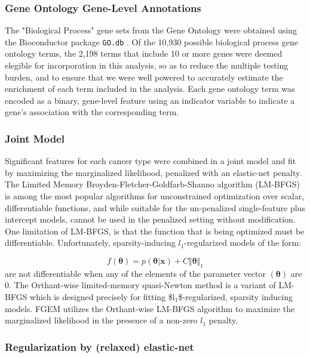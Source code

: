 \subsubsection{Gene Ontology Gene-Level Annotations}\label{sec:orgd117550}

The "Biological Process" gene sets from the Gene Ontology were obtained using the Bioconductor package \texttt{GO.db} \cite{godb}. Of the 10,930 possible biological process gene ontology terms, the 2,198 terms that 
include 10 or more genes were deemed elegible for incorporation in this analysis, so as to reduce the multiple testing burden, and to ensure that we were well powered to accurately estimate the enrichment of each term included in the analysis.  Each gene ontology term was encoded as a binary, gene-level feature using an indicator variable to indicate a gene's association with the corresponding term. 

\subsubsection{Joint Model}\label{sec:orga62a234}

Significant features for each cancer type were combined in a joint model and fit by maximizing the marginalized likelihood, penalized with an elastic-net penalty.  The Limited Memory Broyden-Fletcher-Goldfarb-Shanno algorithm (LM-BFGS) \cite{LMBFGS} is among the most popular algorithms
for unconstrained optimization over scalar, differentiable functions, and while suitable for the un-penalized single-feature plus intercept models, cannot be used in the penalized setting without modification.  One limitation of LM-BFGS, is that the function that is being optimized must be differentiable.  Unfortunately, sparsity-inducing $l_{\text{1}}$-regularized models of the form:

$$f(\boldsymbol{\theta})=p(\boldsymbol{\theta} | \textbf{x}) + C \Vert \boldsymbol{\theta} \Vert_1$$ are not differentiable when any of the elements of the parameter vector $(\boldsymbol{\theta})$ are 0.  The Orthant-wise limited-memory quasi-Newton method is a variant of LM-BFGS which is designed precisely for fitting \$l\(_{\text{1}}\)\$-regularized, sparsity inducing models.  FGEM utilizes the Orthant-wise LM-BFGS algorithm to maximize the marginalized likelihood in the presence of a non-zero $l_{\text{1}}$ penalty.
 
\subsubsection{Regularization by (relaxed) elastic-net}\label{sec:orge3a8031}

